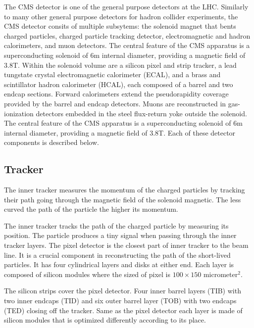 The CMS detector is one of the general purpose detectors at the LHC.
%
Similarly to many other general purpose detectors for hadron collider experiments, the CMS detector consits of multiple subsytems:
the solenoid magnet that bents charged particles, charged particle tracking detector, electromagnetic and hadron calorimeters, and muon detectors.
The central feature of the CMS apparatus is a superconducting solenoid of 6\unit{m} internal diameter, providing a magnetic field of 3.8\unit{T}. Within the solenoid volume are a silicon pixel and strip tracker, a lead tungstate crystal electromagnetic calorimeter (ECAL), and a brass and scintillator hadron calorimeter (HCAL), each composed of a barrel and two endcap sections. Forward calorimeters extend the pseudorapidity coverage provided by the barrel and endcap detectors. Muons are reconstructed in gas-ionization detectors embedded in the steel flux-return yoke outside the solenoid.
The central feature of the CMS apparatus is a superconducting solenoid of 6\unit{m} internal diameter, providing a magnetic field of 3.8\unit{T}.
%
Each of these detector components is described below.

\subsection{Tracker}

The inner tracker measures the momentum of the charged particles by tracking their path going through the magnetic field of the solenoid magnetic.
The less curved the path of the particle the higher its momentum.

The inner tracker tracks the path of the charged particle by measuring its position. The particle produces a tiny signal when passing through the inner tracker layers.
The pixel detector is the closest part of inner tracker to the beam line. It is a crucial component in reconstructing the path of the short-lived particles. It has four cylindrical layers and disks at either end. Each layer is composed of silicon modules  where the sized of pixel is $100\times150$ micrometer$^2$.

The silicon strips cover the pixel detector. Four inner barrel layers (TIB) with two inner endcaps (TID) and six outer barrel layer (TOB) with two endcaps (TED) closing off the tracker. Same as the pixel detector each layer is made of silicon modules that is optimized differently according to its place.

